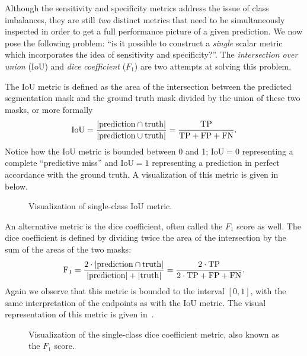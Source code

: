 Although the sensitivity and specificity metrics address the issue of class imbalances, they are still \textit{two} distinct metrics that need to be simultaneously inspected in order to get a full performance picture of a given prediction.
We now pose the following problem: \enquote{is it possible to construct a \textit{single} scalar metric which incorporates the idea of sensitivity and specificity?}.
The \textit{intersection over union} (IoU) and \textit{dice coefficient} ($F_1$) are two attempts at solving this problem.

The IoU metric is defined as the area of the intersection between the predicted segmentation mask and the ground truth mask divided by the union of these two masks, or more formally
%
\begin{equation*}
  \mathrm{IoU}
  =
  \frac{%
    |\mathrm{prediction} \cap \mathrm{truth}|
  }{%
    |\mathrm{prediction} \cup \mathrm{truth}|
  }
  =
  \frac{%
    \mathrm{TP}
  }{%
    \mathrm{TP} + \mathrm{FP} + \mathrm{FN}
  }.
\end{equation*}
%
Notice how the IoU metric is bounded between 0 and 1; $\mathrm{IoU} = 0$ representing a complete \enquote{predictive miss} and $\mathrm{IoU} = 1$ representing a prediction in perfect accordance with the ground truth.
A visualization of this metric is given in  below.

\begin{figure}[H]
  \centering
  
  \caption{%
    Visualization of single-class IoU metric.
  }%
  \label{fig:iou-metric}
\end{figure}

An alternative metric is the dice coefficient, often called the $F_1$ score as well.
The dice coefficient is defined by dividing twice the area of the intersection by the sum of the areas of the two masks:
%
\begin{equation*}
  \mathrm{F_1}
  =
  \frac{%
    2 \cdot |\mathrm{prediction} \cap \mathrm{truth}|
  }{%
    |\mathrm{prediction}| + |\mathrm{truth}|
  }
  =
  \frac{%
    \mathrm{2 \cdot TP}
  }{%
    2 \cdot \mathrm{TP} + \mathrm{FP} + \mathrm{FN}
  }.
\end{equation*}
%
Again we observe that this metric is bounded to the interval $[0, 1]$, with the same interpretation of the endpoints as with the IoU metric.
The visual representation of this metric is given in~.

\begin{figure}[H]
  \centering
  
  \caption{%
    Visualization of the single-class dice coefficient metric, also known as the $F_1$ score.
  }%
  \label{fig:dice-coefficient}
\end{figure}


